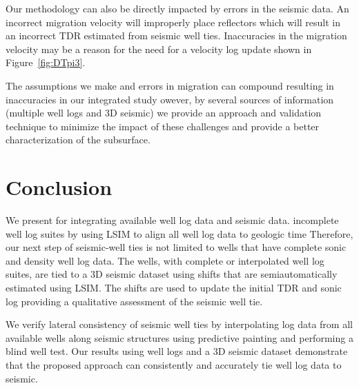 Our methodology can also be directly impacted by errors in the seismic data. An incorrect migration velocity will improperly place reflectors which will result in an incorrect TDR estimated from seismic well ties. Inaccuracies in the migration velocity may be a reason for the need for a velocity log update shown in Figure~\ref{fig:DTpi3}.

The assumptions we make and errors in migration  can compound resulting in  inaccuracies in our integrated study\old{;} owever, by  several sources of information (multiple well logs and 3D seismic) we provide an approach and validation technique to minimize the impact of these challenges and  provide a better characterization of the subsurface.


\section{Conclusion}
We present  for integrating available well log data and  seismic data.   incomplete well log suites by using LSIM to align all well log data to  geologic time\old{;} Therefore, our next step of seismic-well ties is not limited to wells that have complete sonic and density well log data. The wells, with complete or interpolated well log suites, are tied to a 3D seismic dataset using shifts that are semiautomatically estimated using LSIM. The shifts are used to update the initial TDR and sonic log providing a qualitative assessment of the seismic well tie.

We verify lateral consistency of seismic well ties by interpolating log data from all available wells along seismic structures using predictive painting and performing a blind well test. Our results using well logs and a 3D seismic dataset demonstrate that the proposed approach can consistently and accurately tie well log data to seismic.



